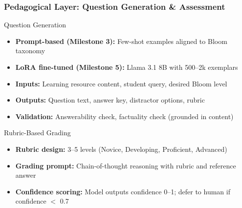 \documentclass[aspectratio=169]{beamer}
\begin{document}
\begin{frame}
\frametitle{Pedagogical Layer: Question Generation \& Assessment}
\begin{block}{Question Generation}
\begin{itemize}
\item \textbf{Prompt-based (Milestone 3):} Few-shot examples aligned to Bloom taxonomy
\item \textbf{LoRA fine-tuned (Milestone 5):} Llama 3.1 8B with 500--2k exemplars
\item \textbf{Inputs:} Learning resource content, student query, desired Bloom level
\item \textbf{Outputs:} Question text, answer key, distractor options, rubric
\item \textbf{Validation:} Answerability check, factuality check (grounded in content)
\end{itemize}
\end{block}

\begin{block}{Rubric-Based Grading}
\begin{itemize}
\item \textbf{Rubric design:} 3--5 levels (Novice, Developing, Proficient, Advanced)
\item \textbf{Grading prompt:} Chain-of-thought reasoning with rubric and reference answer
\item \textbf{Confidence scoring:} Model outputs confidence 0--1; defer to human if confidence $<$ 0.7
\end{itemize}
\end{block}
\end{frame}
\end{document}
